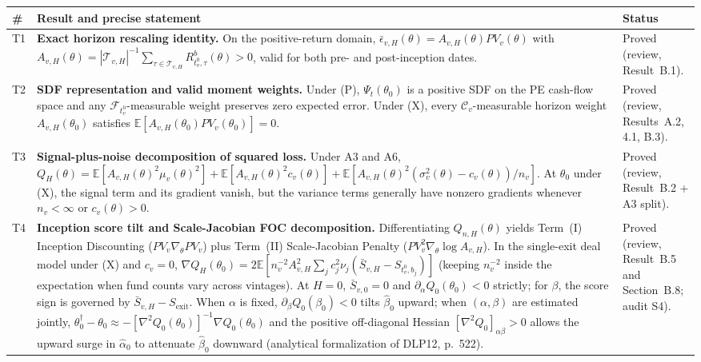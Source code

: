 \documentclass[11pt]{article}
\newcommand{\E}{\mathbb{E}}
\newcommand{\C}{\mathcal{C}}
\newcommand{\F}{\mathcal{F}}
\begin{document}
{\small
\begin{longtable}{@{}L{0.7cm}L{9.4cm}L{5.2cm}@{}}
\toprule
\# & Result and precise statement & Status\\
\midrule
\endhead
T1 & \textbf{Exact horizon rescaling identity.} On the positive-return domain, $\bar\epsilon_{v,H}(\theta)=A_{v,H}(\theta)PV_v(\theta)$ with $A_{v,H}(\theta)=|\mathcal{T}_{v,H}|^{-1}\sum_{\tau\in\mathcal{T}_{v,H}}R^b_{t_v^0,\tau}(\theta)>0$, valid for both pre- and post-inception dates. & Proved (review, Result~B.1).\\
T2 & \textbf{SDF representation and valid moment weights.} Under (P), $\Psi_t(\theta_0)$ is a positive SDF on the PE cash-flow space and any $\F_{t_v^0}$-measurable weight preserves zero expected error. Under (X), every $\C_v$-measurable horizon weight $A_{v,H}(\theta_0)$ satisfies $\E[A_{v,H}(\theta_0)PV_v(\theta_0)]=0$. & Proved (review, Results~A.2, 4.1, B.3).\\
T3 & \textbf{Signal-plus-noise decomposition of squared loss.} Under A3 and A6, $Q_H(\theta)=\E[A_{v,H}(\theta)^2\mu_v(\theta)^2]+\E[A_{v,H}(\theta)^2c_v(\theta)]+\E[A_{v,H}(\theta)^2(\sigma_v^2(\theta)-c_v(\theta))/n_v]$. At $\theta_0$ under (X), the signal term and its gradient vanish, but the variance terms generally have nonzero gradients whenever $n_v<\infty$ or $c_v(\theta)>0$. & Proved (review, Result~B.2 + A3 split).\\
T4 & \textbf{Inception score tilt and Scale-Jacobian FOC decomposition.} Differentiating $Q_{n,H}(\theta)$ yields Term~(I) Inception Discounting ($PV_v\nabla_\theta PV_v$) plus Term~(II) Scale-Jacobian Penalty ($PV_v^2\nabla_\theta\log A_{v,H}$). In the single-exit deal model under (X) and $c_v=0$, $\nabla Q_H(\theta_0)=2\E[n_v^{-2}A_{v,H}^2\sum_j c_j^2\nu_j(\bar S_{v,H}-S_{t_v^0,b_j})]$ (keeping $n_v^{-2}$ inside the expectation when fund counts vary across vintages). At $H=0$, $\bar S_{v,0}=0$ and $\partial_\alpha Q_0(\theta_0)<0$ strictly; for $\beta$, the score sign is governed by $\bar S_{v,H}-S_{\mathrm{exit}}$. When $\alpha$ is fixed, $\partial_\beta Q_0(\beta_0)<0$ tilts $\hat\beta_0$ upward; when $(\alpha,\beta)$ are estimated jointly, $\theta_0^\dagger-\theta_0\approx-[\nabla^2 Q_0(\theta_0)]^{-1}\nabla Q_0(\theta_0)$ and the positive off-diagonal Hessian $[\nabla^2 Q_0]_{\alpha\beta}>0$ allows the upward surge in $\hat\alpha_0$ to attenuate $\hat\beta_0$ downward (analytical formalization of DLP12, p.~522). & Proved (review, Result~B.5 and Section~B.8; audit S4).\\

\end{longtable}}
\end{document}
